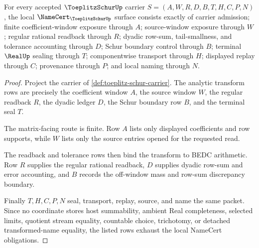 \begin{theorem}
\label{thm:toeplitz-schur-namecert-obligations}
For every accepted $\ToeplitzSchurUp$ carrier $S=(A,W,R,D,B,T,H,C,P,N)$, the local $\NameCert_{\ToeplitzSchurUp}$ surface consists exactly of carrier admission; finite coefficient-window exposure through $A$; source-window exposure through $W$; regular rational readback through $R$; dyadic row-sum, tail-smallness, and tolerance accounting through $D$; Schur boundary control through $B$; terminal $\RealUp$ sealing through $T$; componentwise transport through $H$; displayed replay through $C$; provenance through $P$; and local naming through $N$.
\end{theorem}
\begin{proof}
Project the carrier of \autoref{def:toeplitz-schur-carrier}. The analytic transform rows are precisely the coefficient window $A$, the source window $W$, the regular readback $R$, the dyadic ledger $D$, the Schur boundary row $B$, and the terminal seal $T$.

The matrix-facing route is finite. Row $A$ lists only displayed coefficients and row supports, while $W$ lists only the source entries opened for the requested read.

The readback and tolerance rows then bind the transform to BEDC arithmetic. Row $R$ supplies the regular rational readback, $D$ supplies dyadic row-sum and error accounting, and $B$ records the off-window mass and row-sum discrepancy boundary.

Finally $T,H,C,P,N$ seal, transport, replay, source, and name the same packet. Since no coordinate stores host summability, ambient Real completeness, selected limits, quotient stream equality, countable choice, trichotomy, or detached transformed-name equality, the listed rows exhaust the local NameCert obligations.
\end{proof}

